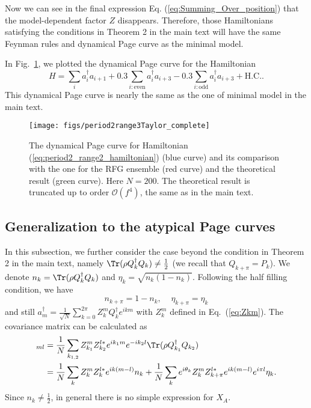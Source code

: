  Now we can see in the final expression Eq. (\ref{eq:Summing_Over_position}) that the model-dependent factor %
$Z$ disappears. Therefore, those Hamiltonians
satisfying the conditions in %
Theorem 2 in the main text will have the same Feynman
rules and dynamical Page curve %
as the minimal model.


In Fig.~\ref{Taylor_completed_range3},
we plotted the dynamical Page curve for the Hamiltonian 
\begin{equation}
H=\sum_{i}a_{i}^{\dagger}a_{i+1}+0.3\sum_{i:\mathrm{even}}a_{i}^{\dagger}a_{i+3}-0.3\sum_{i:\mathrm{odd}}a_{i}^{\dagger}a_{i+3}+\mathrm{H.C.}.\label{eq:period2_range2_hamiltonian}
\end{equation}
This dynamical Page curve is nearly the same as the one of minimal
model in the main text.

\begin{figure}
\texttt{[image: figs/period2range3Taylor\_complete]}

\caption{The dynamical Page curve for Hamiltonian (\ref{eq:period2_range2_hamiltonian})
(blue curve) and its comparison with the one for the RFG ensemble (red
curve) and the theoretical result (green curve). Here $N=200$. The
theoretical result is truncated up to order $\mathcal{O}(f^{4})$,
the same as in the main text. }

\label{Taylor_completed_range3}
\end{figure}

\subsection{Generalization to the %
atypical Page curves}

In this subsection, we %
further consider the case beyond the condition
in %
Theorem 2 in the main text, namely $\Tr(\rho Q_{k}^{\dagger}Q_{k})\neq\frac{1}{2}$
(we recall that $Q_{k+\pi}=P_{k}$). We denote $n_{k}=\Tr(\rho Q_{k}^{\dagger}Q_{k})$
and $\eta_{k}=\sqrt{n_{k}(1-n_{k})}$. Following the half filling condition,
we have 
\[
n_{k+\pi}=1-n_{k},\;\;\;\;\eta_{k+\pi}=\eta_{k}
\]
and still $a_{m}^{\dagger}=\frac{1}{\sqrt{N}}\sum_{k=0}^{2\pi}Z_{k}^{m}Q_{k}^{\dagger}e^{ikm}$
with $Z^m_{k}$ defined in Eq.~(\ref{eq:Zkm}). %
The covariance matrix
can be calculated as
\begin{align*}
[C_A]_{ml} & =\frac{1}{N}\sum_{k_{1,2}}Z_{k_{1}}^{m}Z_{k_{2}}^{l*}e^{ik_{1}m}e^{-ik_{2}l}\Tr(\rho Q_{k_{1}}^{\dagger}Q_{k_{2}})\\
 & =\frac{1}{N}\sum_{k}Z_{k}^{m}Z_{k}^{l*}e^{ik(m-l)}n_{k}+\frac{1}{N}\sum_{k}e^{i\theta_{k}}Z_{k}^{m}Z_{k+\pi}^{l*}e^{ik(m-l)}e^{i\pi l}\eta_{k}.
\end{align*}
Since $n_{k}\neq\frac{1}{2}$, in general there is no simple expression
for $X_{A}$. 

